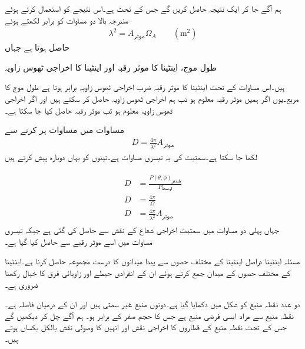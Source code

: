 ہم آگے جا کر ایک نتیجہ حاصل کریں گے جس کے تحت   ہے۔اس نتیجے کو استعمال کرتے ہوئے مندرجہ بالا دو مساوات کو برابر لکھتے ہوئے
\begin{align}\label{مساوات_اینٹینا_اخراجی_ٹھوس_زاویہ_موثر_رقبہ_تعلق}
\lambda^2 =A_{\text{موثر}} \Omega_A \quad \quad (\si{\meter \squared})
\end{align}
حاصل ہوتا ہے جہاں
\begin{description}
 طول موج،
  اینٹینا کا موثر رقبہ اور
 اینٹینا کا اخراجی ٹھوس زاویہ
\end{description}
ہیں۔اس مساوات کے تحت اینٹینا کا موثر رقبہ ضرب اخراجی ٹھوس زاویہ برابر ہوتا ہے  طول موج کا مربع۔یوں اگر ہمیں موثر رقبہ معلوم ہو تب ہم اخراجی ٹھوس زاویہ حاصل کر سکتے ہیں اور اگر اخراجی ٹھوس زاویہ معلوم ہو تب موثر رقبہ حاصل کیا جا سکتا ہے۔

مساوات  میں مساوات  پر کرنے سے
\begin{align}
D=\frac{4\pi}{\lambda^2} A_{\text{موثر}}
\end{align}
لکھا جا سکتا ہے۔سمتیت کی یہ تیسری مساوات ہے۔تینوں کو یہاں دوبارہ پیش کرتے ہیں

\begin{gather}
\begin{aligned}
D&=\frac{P(\theta,\phi)_{\text{بلندتر}}}{P_{\text{اوسط}}} \\
D&=\frac{4\pi}{\Omega} \\
D&=\frac{4\pi}{\lambda^2} A_{\text{موثر}}
\end{aligned}
\end{gather}
جہاں پہلی دو مساوات میں سمتیت اخراجی شعاع کے نقش سے حاصل کی گئی ہے جبکہ تیسری مساوات میں اسے موثر رقبے سے حاصل کیا گیا ہے۔

مسئلہ اینٹینا دراصل اینٹینا کے مختلف حصوں سے پیدا میدانوں کا درست مجموعہ حاصل کرنا ہے۔اینٹینا کے مختلف حصوں کے میدان جمع کرتے ہوئے ان کے انفرادی حیطے اور زاویائی فرق کا خیال رکھنا ضروری ہے۔

 دو عدد نقطہ منبع کو شکل میں دکھایا گیا ہے۔دونوں منبع غیر سمتی ہیں اور ان کے درمیان فاصلہ  ہے۔نقطہ منبع سے مراد ایسی فرضی منبع ہے جس کا حجم صفر کے برابر ہو۔ ہم آگے چل کر  دیکھیں گے جس کے تحت نقطہ منبع کے قطاروں کا اخراجی نقش اور انہیں کا وصولی نقش بالکل یکساں ہوتے ہیں۔    

